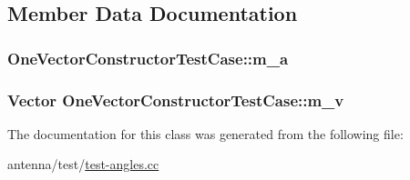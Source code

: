 \subsection{Member Data Documentation}
\subsubsection[{\texorpdfstring{m\+\_\+a}{m_a}}]{ One\+Vector\+Constructor\+Test\+Case\+::m\+\_\+a\hspace{0.3cm}{\ttfamily [private]}}\hypertarget{classOneVectorConstructorTestCase_ae16b4068567f80bfd4b5f03e528adb40}{}\label{classOneVectorConstructorTestCase_ae16b4068567f80bfd4b5f03e528adb40}
\subsubsection[{\texorpdfstring{m\+\_\+v}{m_v}}]{\setlength{\rightskip}{0pt plus 5cm}Vector One\+Vector\+Constructor\+Test\+Case\+::m\+\_\+v\hspace{0.3cm}{\ttfamily [private]}}\hypertarget{classOneVectorConstructorTestCase_a9ff252032d035cbc50d846b96de7385d}{}\label{classOneVectorConstructorTestCase_a9ff252032d035cbc50d846b96de7385d}


The documentation for this class was generated from the following file\+:\begin{DoxyCompactItemize}
\item 
antenna/test/\hyperlink{test-angles_8cc}{test-\/angles.\+cc}\end{DoxyCompactItemize}
